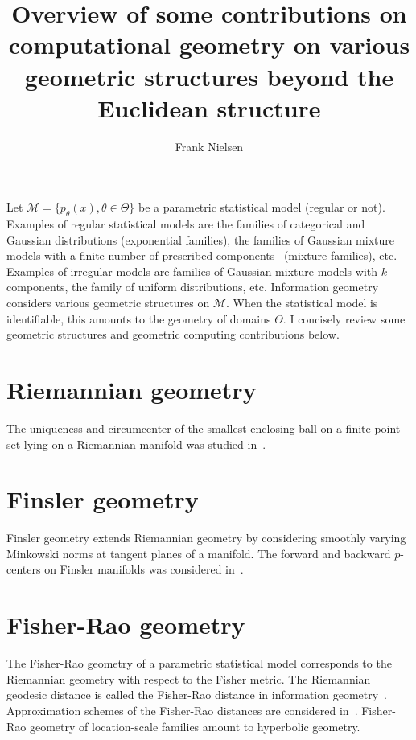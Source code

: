 \documentclass[11pt]{article}
\title{Overview of some contributions on computational geometry on various geometric structures beyond the Euclidean structure}
\author{Frank Nielsen}
\date{}
\def\calM{\mathcal{M}}
\begin{document}
\maketitle

Let $\calM=\{p_\theta(x), \theta\in\Theta\}$ be a parametric statistical model (regular or not).
Examples of regular statistical models are the families of categorical and Gaussian distributions (exponential families), the families of Gaussian mixture models with  a finite number of prescribed components~\cite{nielsen2018geometry} (mixture families), etc.
Examples of irregular models are families of Gaussian mixture models with $k$ components, the family of uniform distributions, etc.
Information geometry considers various geometric structures on $\calM$. When the statistical model is identifiable, this amounts to the geometry of domains $\Theta$.
I concisely review some geometric structures and geometric computing contributions below.


\section*{Riemannian geometry}

The uniqueness and circumcenter of the smallest enclosing ball on a finite point set lying on a Riemannian manifold was studied in~\cite{arnaudon2013approximating}.

\section*{Finsler geometry}

Finsler geometry extends Riemannian geometry by considering smoothly varying Minkowski norms at tangent planes of a manifold.
The forward and backward $p$-centers on Finsler manifolds was considered in~\cite{arnaudon2012medians}.


\section*{Fisher-Rao geometry}

The Fisher-Rao geometry of a parametric statistical model corresponds to the Riemannian geometry with respect to the Fisher metric.
The Riemannian geodesic distance is called the Fisher-Rao distance in information geometry~\cite{nielsen2020elementary}.
Approximation schemes of the Fisher-Rao distances are considered in~\cite{nielsen2023simple,NIELSEN2024}.
Fisher-Rao geometry of location-scale families amount to hyperbolic geometry.
\end{document}
